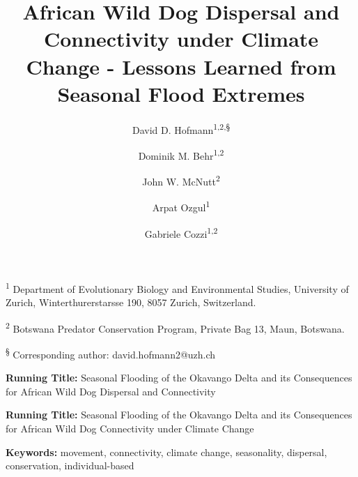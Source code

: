 \documentclass[abstract=on,10pt,a4paper,bibliography=totocnumbered]{article}
\title{African Wild Dog Dispersal and Connectivity under Climate Change -
Lessons Learned from Seasonal Flood Extremes}
\author{
  David D. Hofmann\textsuperscript{1,2,\S} \orcid{0000-0003-3477-4365} \and
  Dominik M. Behr\textsuperscript{1,2} \orcid{0000-0001-7378-8538} \and
  John W. McNutt\textsuperscript{2} \and
  Arpat Ozgul\textsuperscript{1} \orcid{0000-0001-7477-2642} \and
  Gabriele Cozzi\textsuperscript{1,2} \orcid{0000-0002-1744-1940}
}
\begin{document}



\maketitle

\begin{flushleft}

\vspace{0.5cm}

\textsuperscript{1} Department of Evolutionary Biology and Environmental
Studies, University of Zurich, Winterthurerstarsse 190, 8057 Zurich,
Switzerland.

\textsuperscript{2} Botswana Predator Conservation Program, Private Bag 13,
Maun, Botswana.

\textsuperscript{\S} Corresponding author: david.hofmann2@uzh.ch

\vspace{4cm}

\textbf{Running Title:} Seasonal Flooding of the Okavango Delta and its
Consequences for African Wild Dog Dispersal and Connectivity

\textbf{Running Title:} Seasonal Flooding of the Okavango Delta and its
Consequences for African Wild Dog Connectivity under Climate Change

\vspace{0.5cm}

\textbf{Keywords:} movement, connectivity, climate change, seasonality,
dispersal, conservation, individual-based

\end{flushleft}
\end{document}
